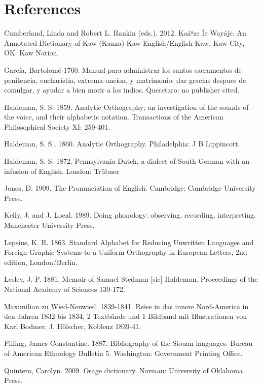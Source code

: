 \documentclass[output=paper]{LSP/langsci}
\begin{document}
\section*{References}


\printbibliography[heading=subbibliography,notkeyword=this]

\begin{reflist}

Cumberland, Linda and Robert L. Rankin (eds.). 2012. Ka\'aⁿze \'Ie Way\'aje.  An Annotated Dictionary of Kaw (Kanza)  Kaw-English/English-Kaw.  Kaw City, OK: Kaw Nation.  

Garc\'ia, Bartolom\'e 1760.  Manual para administrar los santos sacramentos de penitencia, eucharistia, extrema-uncion, y matrimonio: dar gracias despues de comulgar, y ayudar a bien morir a los indios. Queretaro: no publisher cited. 

Haldeman, S. S. 1859. Analytic Orthography; an investigation of the sounds of the voice, and their alphabetic notation.  Transactions of the American Philosophical Society XI: 259-401.   

Haldeman, S. S., 1860.   Analytic Orthography.  Philadelphia: J B Lippincott.

Haldeman, S. S.  1872.  Pennsylvania Dutch, a dialect of South German with an infusion of English.  London: Tr\"ubner. 

Jones, D. 1909.  The Pronunciation of English.  Cambridge: Cambridge University Press.

Kelly, J. and J. Local. 1989.  Doing phonology: observing, recording, interpreting.  Manchester University Press. 

Lepsius, K. R. 1863. Standard Alphabet for Reducing Unwritten Languages and Foreign Graphic Systems to a Uniform Orthography in European Letters, 2nd edition, London/Berlin.  

Lesley, J. P. 1881.   Memoir of Samuel Stedman [sic] Haldeman.  Proceedings of the National Academy of Sciences 139-172.

Maximilian zu Wied-Neuwied. 1839-1841.  Reise in das innere Nord-America in den Jahren 1832 bis 1834, 2 Textb\"ande und 1 Bildband mit Illustrationen von Karl Bodmer, J. H\"olscher, Koblenz 1839-41.

Pilling, James Constantine. 1887.  Bibliography of the Siouan languages.  Bureau of American Ethnology Bulletin 5. Washington: Government Printing Office.

Quintero, Carolyn.  2009.  Osage dictionary.  Norman: University of Oklahoma Press.  


\end{reflist}
\end{document}
